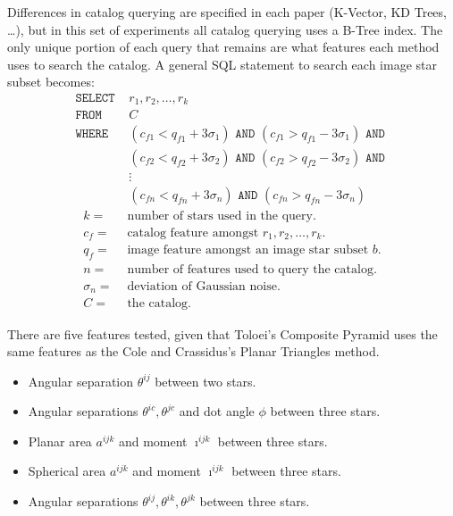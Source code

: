 Differences in catalog querying are specified in each paper (K-Vector, KD Trees, \ldots), but in this set of
experiments all catalog querying uses a B-Tree index.
The only unique portion of each query that remains are what features each method uses to search the catalog.
A general SQL statement to search each image star subset becomes:
\begin{align*}
    \texttt{SELECT } &r_1, r_2, \ldots, r_k \\
    \texttt{FROM } &C \\
    \texttt{WHERE } &(c_{f1} < q_{f1} + 3\sigma_1) \texttt{ AND } (c_{f1} > q_{f1} - 3\sigma_1) \texttt{ AND } \\
    &(c_{f2} < q_{f2} + 3\sigma_2) \texttt{ AND } (c_{f2} > q_{f2} - 3\sigma_2) \texttt{ AND } \\
    &\vdots \\
    &(c_{fn} < q_{fn} + 3\sigma_n) \texttt{ AND } (c_{fn} > q_{fn} - 3\sigma_n)
\end{align*}
\begin{align*}
    k =& \text{ number of stars used in the query.} \\
    c_f =& \text{ catalog feature amongst } r_1, r_2, \ldots, r_k.\\
    q_f =& \text{ image feature amongst an image star subset } b. \\
    n =& \text{ number of features used to query the catalog.} \\
    \sigma_n =& \text{ deviation of Gaussian noise.} \\
    C =& \text{ the catalog.}
\end{align*}

There are five features tested, given that Toloei's Composite Pyramid uses the same features as the Cole and
Crassidus's Planar Triangles method.
\begin{itemize}
    \item Angular separation $\theta^{ij}$ between two stars.
    \item Angular separations $\theta^{ic}, \theta^{jc}$ and dot angle $\phi$ between three stars.
    \item Planar area $a^{ijk}$ and moment $\imath^{ijk}$ between three stars.
    \item Spherical area $a^{ijk}$ and moment $\imath^{ijk}$ between three stars.
    \item Angular separations $\theta^{ij}, \theta^{ik}, \theta^{jk}$ between three stars.
\end{itemize}

